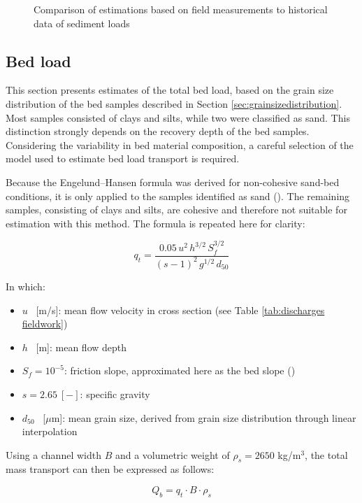 \begin{figure}[h!]
    \caption{Comparison of estimations based on field measurements to historical data of sediment loads}
    \label{fig:correlationmatrices}
\end{figure}

\subsection{Bed load}
\label{sec: Bed load}
This section presents estimates of the total bed load, based on the grain size distribution of the bed samples described in Section \ref{sec:grainsizedistribution}. Most samples consisted of clays and silts, while two were classified as sand. This distinction strongly depends on the recovery depth of the bed samples. Considering the variability in bed material composition, a careful selection of the model used to estimate bed load transport is required. 

Because the Engelund–Hansen formula was derived for non-cohesive sand-bed conditions, it is only applied to the samples identified as sand (\cite{engelundMonographSedimentTransport1967}). The remaining samples, consisting of clays and silts, are cohesive and therefore not suitable for estimation with this method. The formula is repeated here for clarity:

\begin{equation}
    q_{t} = \frac{0.05\,u^{2}\,h^{3/2}\,S_{f}^{3/2}}{(s - 1)^{2}\,g^{1/2}\,d_{50}}
    \label{eq:engelund_hansen}
\end{equation}

In which:
\begin{itemize}
    \item $u$ ~[m/s]: mean flow velocity in cross section (see Table \ref{tab:discharges fieldwork})
    \item $h$ ~[m]: mean flow depth
    \item $S_f = 10^{-5}$: friction slope, approximated here as the bed slope (\cite{lopezweibelSourcesTemporalDynamics2022})
    \item $s = 2.65 ~[-]$: specific gravity
    \item $d_{50}$ ~[$\mu$m]: mean grain size, derived from grain size distribution through linear interpolation
\end{itemize}

Using a channel width $B$ and a volumetric weight of $\rho_s = 2650 $ kg/m$^3$, the total mass transport can then be expressed as follows:

\begin{equation}
    Q_b = q_t \cdot B \cdot \rho_s
 \end{equation}

